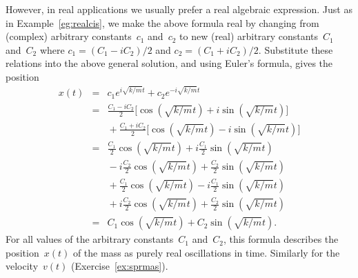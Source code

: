 \begin{example}
\begin{solution}
However, in real applications we usually prefer a real algebraic expression.
Just as in Example~\ref{eg:realcis}, we make the above formula real by changing from (complex) arbitrary constants~\(c_1\) and~\(c_2\) to new (real) arbitrary constants~\(C_1\) and~\(C_2\) where \(c_1=(C_1-iC_2)/2\) and \(c_2=(C_1+iC_2)/2\).
Substitute these relations into the above general solution, and using Euler's formula, gives the position
\begin{eqnarray*}
x(t)&=&c_1e^{i\sqrt{k/m}t}+c_2e^{-i\sqrt{k/m}t}
\\&=&\frac{C_1-iC_2}2\big[\cos(\sqrt{k/m}t)+i\sin(\sqrt{k/m}t)\big]
\\&&{}
+\frac{C_1+iC_2}2\big[\cos(\sqrt{k/m}t)-i\sin(\sqrt{k/m}t)\big]
\\&=&
\frac{C_1}2\cos(\sqrt{k/m}t)+i\frac{C_1}2\sin(\sqrt{k/m}t)
\\&&{}
-i\frac{C_2}2\cos(\sqrt{k/m}t)+\frac{C_2}2\sin(\sqrt{k/m}t)
\\&&{}
+\frac{C_1}2\cos(\sqrt{k/m}t)-i\frac{C_1}2\sin(\sqrt{k/m}t)
\\&&{}
+i\frac{C_2}2\cos(\sqrt{k/m}t)+\frac{C_2}2\sin(\sqrt{k/m}t)
\\&=&C_1\cos(\sqrt{k/m}t)+C_2\sin(\sqrt{k/m}t).
\end{eqnarray*}
For all values of the arbitrary constants~\(C_1\) and~\(C_2\), this formula describes the position~\(x(t)\) of the mass as purely real oscillations in time.
Similarly for the velocity~\(v(t)\) (Exercise~\ref{ex:sprmas}).
\end{solution}
\end{example}







\begin{comment}
Probable section includes Cayley--Hamilton theorem: recall section~\ref{sec:mpmev}, compute powers of matrices, then C-H.
Other applications include Markov chains.

Possibly develop a little more theory on similarity of matrices and coordinate transform of matrices.  Then Jordan form and solving non-diagonalisable systems of differential equations.

Possibly something on {Emergent quasi-stationary dynamics of metastable states} but perhaps done in 7.1.2--3. (Can one have too many buzz-words?)
\end{comment}















